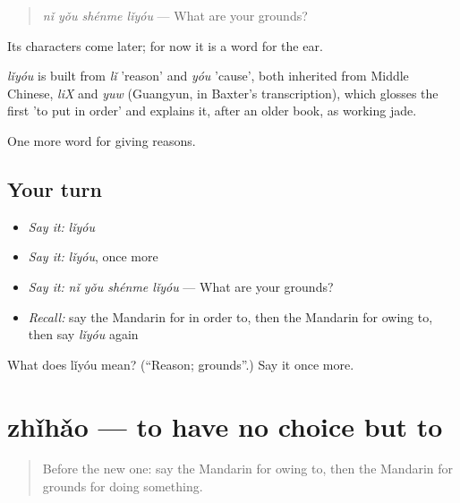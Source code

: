 \begin{quote}
\emph{nǐ yǒu shénme lǐyóu} — What are your grounds?
\end{quote}

Its characters come later; for now it is a word for the ear.

\begin{cousinweb}
\emph{lǐyóu} is built from \emph{lǐ} 'reason' and \emph{yóu} 'cause', both inherited from Middle Chinese, \emph{liX} and \emph{yuw} (Guangyun, in Baxter's transcription), which glosses the first 'to put in order' and explains it, after an older book, as working jade.
\end{cousinweb}

\begin{grammarlens}[title={What you've built}]
One more word for giving reasons.
\end{grammarlens}

\subsection*{Your turn}
\begin{itemize}
\raggedright
  \item \emph{Say it:} \emph{lǐyóu}
  \item \emph{Say it:} \emph{lǐyóu}, once more
  \item \emph{Say it:} \emph{nǐ yǒu shénme lǐyóu} — What are your grounds?
  \item \emph{Recall:} say the Mandarin for in order to, then the Mandarin for owing to, then say \emph{lǐyóu} again
\end{itemize}

\begin{tcolorbox}[breakable,colback=teal!4,colframe=teal!35!black,title={Before you move on}]
What does lǐyóu mean? (\textquotedblleft{}Reason; grounds\textquotedblright{}.) Say it once more.
\end{tcolorbox}
\section[zhǐhǎo]{zhǐhǎo — to have no choice but to}

\label{lesson:ZH-C235-zhihao}



\begin{quote}
Before the new one: say the Mandarin for owing to, then the Mandarin for grounds for doing something.
\end{quote}

